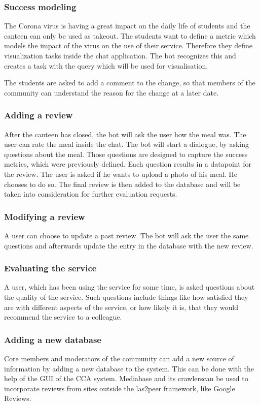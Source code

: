 \subsubsection{Success modeling} The Corona virus is having a great impact on the daily life of students and the canteen can only be used as takeout. The students want to define a metric which models the impact of the virus on the use of their service. Therefore they define visualization tasks inside the chat application. The bot recognizes this and creates a task with the query which will be used for visualisation.

The students are asked to add a comment to the change, so that members of the community can understand the reason for the change at a later date.

\subsubsection{Adding a review} After the canteen has closed, the bot will ask the user how the meal was. The user can rate the meal inside the chat. The bot will start a dialogue, by asking questions about the meal. Those questions are designed to capture the success metrics, which were previously defined. Each question results in a datapoint for the review. The user is asked if he wants to upload a photo of his meal. He chooses to do so. The final review is then added to the database and will be taken into consideration for further evaluation requests.

\subsubsection{Modifying a review} A user can choose to update a past review. The bot will ask the user the same questions and afterwards update the entry in the database with the new review.

\subsubsection{Evaluating the service} A user, which has been using the service for some time, is asked questions about the quality of the service. Such questions include things like how satisfied they are with different aspects of the service, or how likely it is, that they would recommend the service to a colleague.

\subsubsection{Adding a new database} Core members and moderators of the community can add a new source of information by adding a new database to the system. This can be done with the help of the GUI of the CCA system. Mediabase and its crawlerscan be used to incorporate reviews from sites outside the las2peer framework, like Google Reviews.

